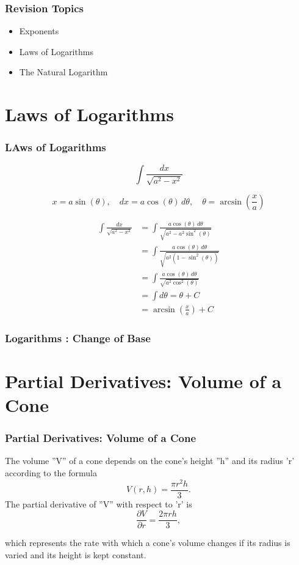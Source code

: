 \documentclass{beamer}
\begin{document}
\begin{frame}
\frametitle{Revision Topics}
\begin{itemize}
\item Exponents
\item Laws of Logarithms
\item The Natural Logarithm
\end{itemize}
\end{frame}
\section{Laws of Logarithms}
\begin{frame}
\frametitle{LAws of Logarithms}
\[\int\frac{dx}{\sqrt{a^2-x^2}}\]

\[x=a\sin(\theta),\quad dx=a\cos(\theta)\,d\theta, \quad \theta=\arcsin\left(\frac{x}{a}\right)\]

{\large
	\begin{eqnarray}
	\int\frac{dx}{\sqrt{a^2-x^2}} & = \int\frac{a\cos(\theta)\,d\theta}{\sqrt{a^2-a^2\sin^2(\theta)}}\\ \nonumber &= \int\frac{a\cos(\theta)\,d\theta}{\sqrt{a^2(1-\sin^2(\theta))}} \\ \nonumber
	& = \int\frac{a\cos(\theta)\,d\theta}{\sqrt{a^2\cos^2(\theta)}} \\ &= \int d\theta=\theta+C \\ \nonumber &=\arcsin\left(\frac{x}{a}\right)+C
	\end{eqnarray}
}
\end{frame}





\begin{frame}
\frametitle{Logarithms :  Change of Base}
\Large

\end{frame}

\section{Partial Derivatives: Volume of a Cone}
\begin{frame}
\frametitle{Partial Derivatives: Volume of a Cone}
\Large
The volume ''V'' of a cone depends on the cone's height ''h'' and its radius 'r' according to the formula
\[V(r, h) = \frac{\pi r^2 h}{3}.\]
The partial derivative of ''V'' with respect to 'r' is
\[\frac{ \partial V}{\partial r} = \frac{ 2 \pi r h}{3},\]

which represents the rate with which a cone's volume changes if its radius is varied and its height is kept constant.

\end{frame}
\end{document}
